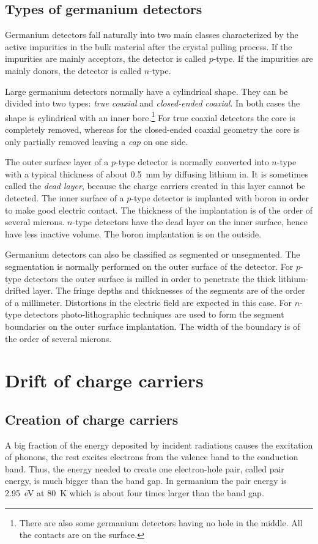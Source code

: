 \subsection{Types of germanium detectors}
\label{sec:det:type}
Germanium detectors fall naturally into two main classes characterized by the active impurities in the bulk material after the crystal pulling process. If the impurities are mainly acceptors, the detector is called $p$-type. If the impurities are mainly donors, the detector is called $n$-type. 

Large germanium detectors normally have a cylindrical shape. They can be divided into two types: \textit{true coaxial} and \textit{closed-ended coaxial}. In both cases the shape is cylindrical with an inner bore.\footnote{There are also some germanium detectors having no hole in the middle. All the contacts are on the surface.} For true coaxial detectors the core is completely removed, whereas for the closed-ended coaxial geometry the core is only partially removed leaving a \textit{cap} on one side.

The outer surface layer of a $p$-type detector is normally converted into $n$-type with a typical thickness of about 0.5~mm by diffusing lithium in. It is sometimes called the \textit{dead layer}, because the charge carriers created in this layer cannot be detected. The inner surface of a $p$-type detector is implanted with boron in order to make good electric contact. The thickness of the implantation is of the order of several microns. $n$-type detectors have the dead layer on the inner surface, hence have less inactive volume. The boron implantation is on the outside.

Germanium detectors can also be classified as segmented or unsegmented. The segmentation is normally performed on the outer surface of the detector. For $p$-type detectors the outer surface is milled in order to penetrate the thick lithium-drifted layer. The fringe depths and thicknesses of the segments are of the order of a millimeter. Distortions in the electric field are expected in this case. For $n$-type detectors photo-lithographic techniques are used to form the segment boundaries on the outer surface implantation. The width of the boundary is of the order of several microns.

\section{Drift of charge carriers}
\label{sec:det:drift}
\subsection{Creation of charge carriers}
\label{sec:det:exit}
A big fraction of the energy deposited by incident radiations causes the excitation of phonons, the rest excites electrons from the valence band to the conduction band. Thus, the energy needed to create one electron-hole pair, called pair energy, is much bigger than the band gap. In germanium the pair energy is 2.95~eV at 80~K which is about four times larger than the band gap.

